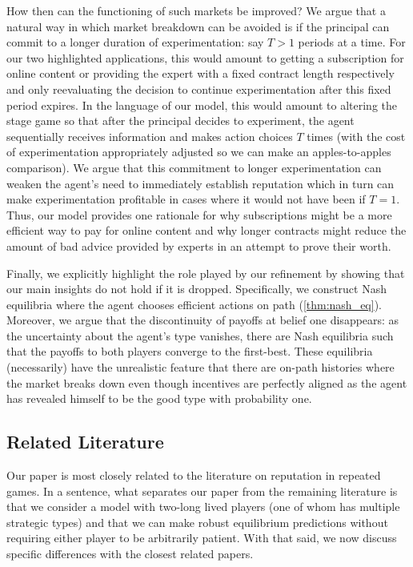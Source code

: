 \documentclass[11pt,reqno]{amsart}
\begin{document}
How then can the functioning of such markets be improved? We argue that a natural way in which market breakdown can be avoided is if the principal can commit to a longer duration of experimentation: say $T>1$ periods at a time. For our two highlighted applications, this would amount to getting a subscription for online content or providing the expert with a fixed contract length respectively and only reevaluating the decision to continue experimentation after this fixed period expires. In the language of our model, this would amount to altering the stage game so that after the principal decides to experiment, the agent sequentially receives information and makes action choices $T$ times (with the cost of experimentation appropriately adjusted so we can make an apples-to-apples comparison). We argue that this commitment to longer experimentation can weaken the agent's need to immediately establish reputation which in turn can make experimentation profitable in cases where it would not have been if $T=1$. Thus, our model provides one rationale for why subscriptions might be a more efficient way to pay for online content and why longer contracts might reduce the amount of bad advice provided by experts in an attempt to prove their worth.

Finally, we explicitly highlight the role played by our refinement by showing that our main insights do not hold if it is dropped. Specifically, we construct Nash equilibria where the agent chooses efficient actions on path (\cref{thm:nash_eq}). Moreover, we argue that the discontinuity of payoffs at belief one disappears: as the uncertainty about the agent's type vanishes, there are Nash equilibria such that the payoffs to both players converge to the first-best. These equilibria (necessarily) have the unrealistic feature that there are on-path histories where the market breaks down even though incentives are perfectly aligned as the agent has revealed himself to be the good type with probability one.

\subsection{Related Literature}\label{sec:rel_lit}

Our paper is most closely related to the literature on reputation in repeated games. In a sentence, what separates our paper from the remaining literature is that we consider a model with two-long lived players (one of whom has multiple strategic types) and that we can make robust equilibrium predictions without requiring either player to be arbitrarily patient. With that said, we now discuss specific differences with the closest related papers.
\end{document}
